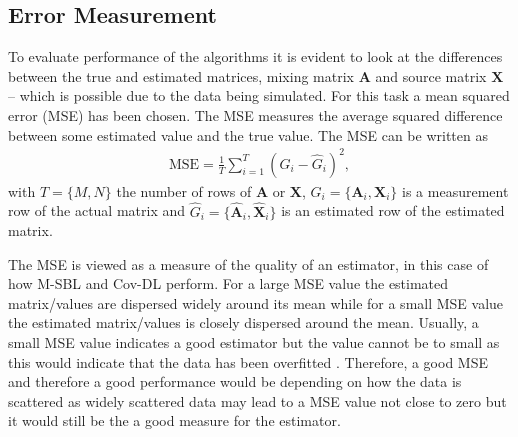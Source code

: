 \subsection{Error Measurement}  
To evaluate performance of the algorithms it is evident to look at the differences between the true and estimated matrices, mixing matrix $\mathbf{A}$ and source matrix $\mathbf{X}$ -- which is possible due to the data being simulated. 
For this task a mean squared error (MSE) has been chosen. 
The MSE measures the average squared difference between some estimated value and the true value. 
The MSE can be written as
\begin{align*}
\text{MSE} = \frac{1}{T} \sum_{i=1}^T (G_i - \hat{G}_i)^2,  
\end{align*}
with $T = \{M, N\}$ the number of rows of $\mathbf{A}$ or $\mathbf{X}$, $G_i = \{ \mathbf{A}_i, \mathbf{X}_i\}$ is a measurement row of the actual matrix and $\hat{G}_i = \{\hat{\mathbf{A}}_i,\hat{\mathbf{X}}_i\}$ is an estimated row of the estimated matrix.

The MSE is viewed as a measure of the quality of an estimator, in this case of how M-SBL and Cov-DL perform. 
For a large MSE value the estimated matrix/values are dispersed widely around its mean while for a small MSE value the estimated matrix/values is closely dispersed around the mean. 
Usually, a small MSE value indicates a good estimator but the value cannot be to small as this would indicate that the data has been overfitted . 
Therefore, a good MSE and therefore a good performance would be depending on how the data is scattered as widely scattered data may lead to a MSE value not close to zero but it would still be the a good measure for the estimator.
